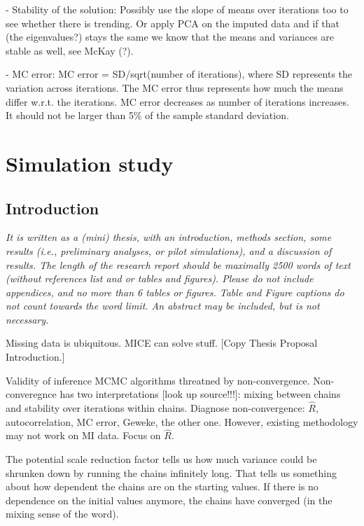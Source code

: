 \documentclass[article]{jss}
\begin{document}
- Stability of the solution: Possibly use the slope of means over iterations too to see whether there is trending. Or apply PCA on the imputed data and if that (the eigenvalues?) stays the same we know that the means and variances are stable as well, see McKay (?). 

- MC error: MC error = SD/sqrt(number of iterations), where SD represents the variation across iterations. The MC error thus represents how much the means differ w.r.t. the iterations. MC error decreases as number of iterations increases. It should not be larger than 5\% of the sample standard deviation.


\section{Simulation study}%

\subsection{Introduction}

\emph{It is written as a (mini) thesis, with an introduction, methods section, some results (i.e., preliminary analyses, or pilot simulations), and a discussion of results. The length of the research report should be maximally 2500 words of text (without references list and or tables and figures). Please do not include appendices, and no more than 6 tables or figures. Table and Figure captions do not count towards the word limit. An abstract may be included, but is not necessary.}

Missing data is ubiquitous. MICE can solve stuff. [Copy Thesis Proposal Introduction.]

Validity of inference MCMC algorithms threatned by non-convergence. Non-converegnce has two interpretations [look up source!!!]: mixing between chains and stability over iterations within chains. Diagnose non-convergence: $\widehat{R}$, autocorrelation, MC error, Geweke, the other one. However, existing methodology may not work on MI data. Focus on $\widehat{R}$.

The potential scale reduction factor tells us how much variance could be shrunken down by running the chains infinitely long. That tells us something about how dependent the chains are on the starting values. If there is no dependence on the initial values anymore, the chains have converged (in the mixing sense of the word).
\end{document}

